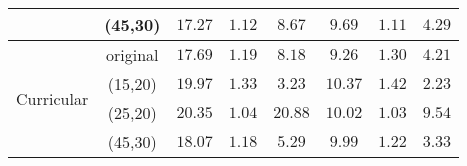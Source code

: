 \documentclass[nohyperref]{article}
\theoremstyle{plain}
\theoremstyle{definition}
\theoremstyle{remark}
\begin{document}
\begin{table*}
\begin{tabular}{ c | c | ccc | ccc}
                              & (45,30) & $17.27$ & $1.12$ & $8.67$  & $9.69$  & $1.11$  & $4.29$  \\ \hline 
                              & original  & $\mathbf{17.69}$ & $1.19$ & $8.18$  & $\mathbf{9.26}$  & $1.30$  & $4.21$  \\
  \multirow{2}{*}{Curricular} & (15,20) & $19.97$ & $1.33$ & $\mathbf{3.23}$  & $10.37$ & $1.42$  & $\mathbf{2.23}$  \\
                              & (25,20) & $20.35$ & $\mathbf{1.04}$ & $20.88$ & $10.02$ & $\mathbf{1.03}$  & $9.54$  \\
                              & (45,30) & $18.07$ & $1.18$ & $5.29$  & $9.99$  & $1.22$  &  $3.33$ \\ \hline 
\end{tabular}
\label{tab:table5}
\end{table*}
\end{document}

